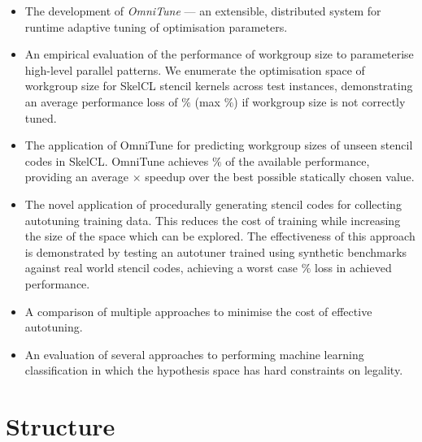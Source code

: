 \begin{itemize}
\item The development of \emph{OmniTune} --- an extensible,
  distributed system for runtime adaptive tuning of optimisation
  parameters.
\item An empirical evaluation of the performance of workgroup size to
  parameterise high-level parallel patterns. We enumerate the
  optimisation space of workgroup size for SkelCL stencil kernels
  across  test instances, demonstrating
  an average performance loss of
  $\%$ (max
  $\%$) if workgroup size is not
  correctly tuned. %
\item The application of OmniTune for predicting workgroup sizes of
  unseen stencil codes in SkelCL. OmniTune achieves
  $\%$ of the available
  performance, providing an average
  $\times$ speedup over the
  best possible statically chosen value.
\item The novel application of procedurally generating stencil codes
  for collecting autotuning training data. This reduces the cost of
  training while increasing the size of the space which can be
  explored. The effectiveness of this approach is demonstrated by
  testing an autotuner trained using synthetic benchmarks against
   real world stencil codes, achieving a
  worst case
  $\%$
  loss in achieved performance.
\item A comparison of multiple approaches to minimise the cost of
  effective autotuning. 
\item An evaluation of several approaches to performing machine
  learning classification in which the hypothesis space has hard
  constraints on legality.
\end{itemize}

\section{Structure}

